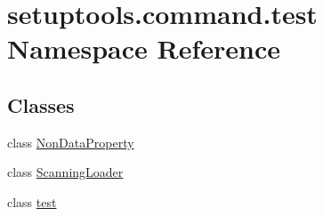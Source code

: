 \hypertarget{namespacesetuptools_1_1command_1_1test}{}\section{setuptools.\+command.\+test Namespace Reference}
\label{namespacesetuptools_1_1command_1_1test}
\subsection*{Classes}
\begin{DoxyCompactItemize}
\item 
class \hyperlink{classsetuptools_1_1command_1_1test_1_1_non_data_property}{Non\+Data\+Property}
\item 
class \hyperlink{classsetuptools_1_1command_1_1test_1_1_scanning_loader}{Scanning\+Loader}
\item 
class \hyperlink{classsetuptools_1_1command_1_1test_1_1test}{test}
\end{DoxyCompactItemize}
